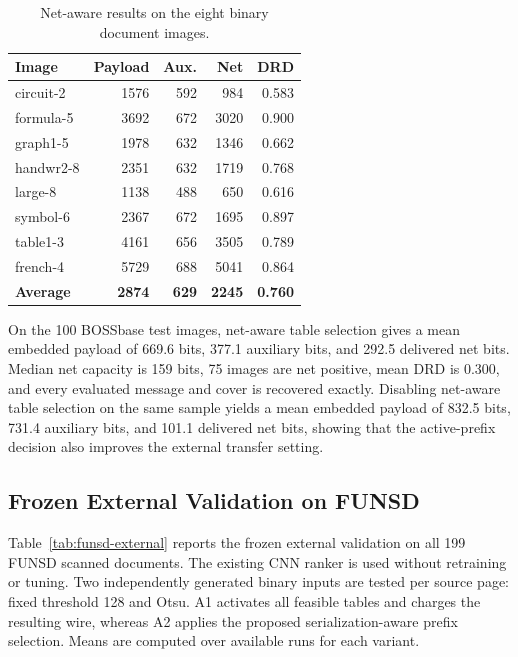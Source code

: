 \begin{table}[t]
\centering
\caption{Net-aware results on the eight binary document images.}
\label{tab:document-net}
\begin{tabular}{@{}lrrrr@{}}
\toprule
\textbf{Image} & \textbf{Payload} & \textbf{Aux.} & \textbf{Net} & \textbf{DRD} \\
\midrule
circuit-2 & 1576 & 592 & 984 & 0.583 \\
formula-5 & 3692 & 672 & 3020 & 0.900 \\
graph1-5 & 1978 & 632 & 1346 & 0.662 \\
handwr2-8 & 2351 & 632 & 1719 & 0.768 \\
large-8 & 1138 & 488 & 650 & 0.616 \\
symbol-6 & 2367 & 672 & 1695 & 0.897 \\
table1-3 & 4161 & 656 & 3505 & 0.789 \\
french-4 & 5729 & 688 & 5041 & 0.864 \\
\midrule
\textbf{Average} & \textbf{2874} & \textbf{629} & \textbf{2245} & \textbf{0.760} \\
\bottomrule
\end{tabular}
\end{table}

\RevisionAddBegin
On the 100 BOSSbase test images, net-aware table selection gives a mean
embedded payload of 669.6 bits, 377.1 auxiliary bits, and 292.5 delivered net
bits. Median net capacity is 159 bits, 75 images are net positive, mean DRD is
0.300, and every evaluated message and cover is recovered exactly. Disabling
net-aware table selection on the same sample yields a mean embedded payload of
832.5 bits, 731.4 auxiliary bits, and 101.1 delivered net bits, showing that the
active-prefix decision also improves the external transfer setting.
\RevisionAddEnd

\RevisionAddBegin
\subsection{Frozen External Validation on FUNSD}
\label{subsec:funsd-external}

Table~\ref{tab:funsd-external} reports the frozen external validation on all
199 FUNSD scanned documents. The existing CNN ranker is used without retraining
or tuning. Two independently generated binary inputs are tested per source page:
fixed threshold 128 and Otsu. A1 activates all feasible tables and charges the
resulting wire, whereas A2 applies the proposed serialization-aware prefix
selection. Means are computed over available runs for each variant.
\RevisionAddEnd


